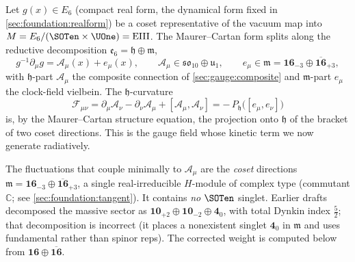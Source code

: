 Let $g(x)\in E_{6}$ (compact real form, the dynamical form fixed in
\autoref{sec:foundation:realform}) be a coset representative of the
vacuum map into $M=E_{6}/(\SOTen\times\UOne)=\mathrm{EIII}$. The
Maurer--Cartan form splits along the reductive decomposition
$\mathfrak e_{6}=\mathfrak h\oplus\mathfrak m$,
\begin{equation}\label{eq:app-ym:MC}
  g^{-1}\partial_{\mu}g
  = \mathcal A_{\mu}(x) + e_{\mu}(x),
  \qquad
  \mathcal A_{\mu}\in\mathfrak{so}_{10}\oplus\mathfrak u_{1},
  \qquad
  e_{\mu}\in\mathfrak m
  =\mathbf{16}_{-3}\oplus\overline{\mathbf{16}}_{+3},
\end{equation}
with $\mathfrak h$-part $\mathcal A_{\mu}$ the composite connection of
\autoref{sec:gauge:composite} and $\mathfrak m$-part $e_{\mu}$ the
clock-field vielbein. The $\mathfrak h$-curvature
\begin{equation}\label{eq:app-ym:curv}
  \mathcal F_{\mu\nu}
  =\partial_{\mu}\mathcal A_{\nu}-\partial_{\nu}\mathcal A_{\mu}
   +[\mathcal A_{\mu},\mathcal A_{\nu}]
  =-\,P_{\mathfrak h}\bigl([e_{\mu},e_{\nu}]\bigr)
\end{equation}
is, by the Maurer--Cartan structure equation, the projection onto
$\mathfrak h$ of the bracket of two coset directions. This is the gauge
field whose kinetic term we now generate radiatively.

\begin{remark}\label{rem:app-ym:multiplet}
The fluctuations that couple minimally to $\mathcal A_{\mu}$ are the
\emph{coset} directions $\mathfrak m=\mathbf{16}_{-3}\oplus
\overline{\mathbf{16}}_{+3}$, a single real-irreducible $H$-module of
complex type (commutant $\mathbb C$; see
\autoref{sec:foundation:tangent}). It contains \emph{no} $\SOTen$
singlet. Earlier drafts decomposed the massive sector as
$\mathbf{10}_{+2}\oplus\mathbf{10}_{-2}\oplus\mathbf 4_{0}$, with total
Dynkin index $\tfrac52$; that decomposition is incorrect (it places a
nonexistent singlet $\mathbf 4_{0}$ in $\mathfrak m$ and uses
fundamental rather than spinor reps). The corrected weight is computed
below from $\mathbf{16}\oplus\overline{\mathbf{16}}$.
\end{remark}

